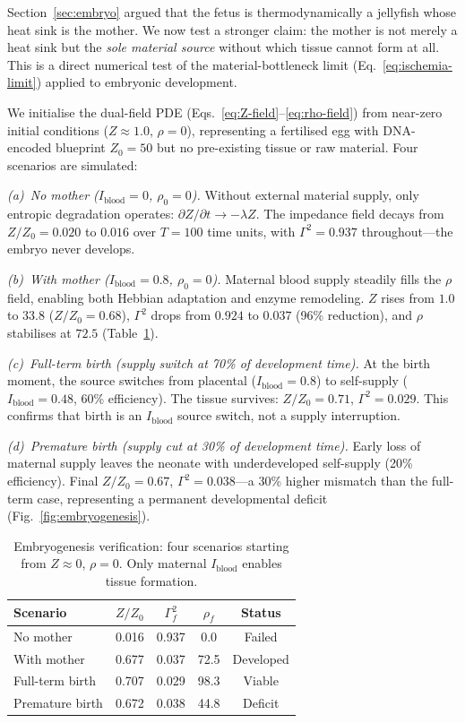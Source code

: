 ﻿\documentclass[aps,pre,twocolumn,superscriptaddress,floatfix]{revtex4-2}
\begin{document}
Section~\ref{sec:embryo} argued that the fetus is thermodynamically
a jellyfish whose heat sink is the mother.
We now test a stronger claim: the mother is not merely a heat sink
but the \emph{sole material source} without which tissue cannot form
at all.
This is a direct numerical test of the material-bottleneck limit
(Eq.~\eqref{eq:ischemia-limit}) applied to embryonic development.

We initialise the dual-field PDE
(Eqs.~\eqref{eq:Z-field}--\eqref{eq:rho-field})
from near-zero initial conditions ($Z \approx 1.0$, $\rho = 0$),
representing a fertilised egg with DNA-encoded blueprint $Z_0 = 50$
but no pre-existing tissue or raw material.
Four scenarios are simulated:

\emph{(a)~No mother ($I_{\mathrm{blood}} = 0$,
$\rho_0 = 0$).}
Without external material supply, only entropic degradation
operates: $\partial Z/\partial t \to -\lambda Z$.
The impedance field decays from $Z/Z_0 = 0.020$ to $0.016$
over $T = 100$ time units, with $\Gamma^2 = 0.937$
throughout---the embryo never develops.

\emph{(b)~With mother ($I_{\mathrm{blood}} = 0.8$,
$\rho_0 = 0$).}
Maternal blood supply steadily fills the $\rho$ field,
enabling both Hebbian adaptation and enzyme remodeling.
$Z$ rises from $1.0$ to $33.8$ ($Z/Z_0 = 0.68$),
$\Gamma^2$ drops from $0.924$ to $0.037$ (96\% reduction),
and $\rho$ stabilises at $72.5$
(Table~\ref{tab:embryogenesis}).

\emph{(c)~Full-term birth (supply switch at 70\%
of development time).}
At the birth moment, the source switches from placental
($I_{\mathrm{blood}} = 0.8$) to self-supply
($I_{\mathrm{blood}} = 0.48$, 60\% efficiency).
The tissue survives: $Z/Z_0 = 0.71$, $\Gamma^2 = 0.029$.
This confirms that birth is an $I_{\mathrm{blood}}$
source switch, not a supply interruption.

\emph{(d)~Premature birth (supply cut at 30\%
of development time).}
Early loss of maternal supply leaves the neonate with
underdeveloped self-supply (20\% efficiency).
Final $Z/Z_0 = 0.67$, $\Gamma^2 = 0.038$---a
30\% higher mismatch than the full-term case,
representing a permanent developmental deficit
(Fig.~\ref{fig:embryogenesis}).

\begin{table}[h]
  \centering
  \caption{Embryogenesis verification: four scenarios starting
  from $Z \approx 0$, $\rho = 0$.
  Only maternal $I_{\mathrm{blood}}$ enables tissue formation.}
  \label{tab:embryogenesis}
  \begin{tabular}{lcccc}
  \hline
  Scenario & $Z/Z_0$ & $\Gamma^2_f$ & $\rho_f$ & Status \\
  \hline
  No mother          & 0.016 & 0.937 &   0.0 & Failed  \\
  With mother        & 0.677 & 0.037 &  72.5 & Developed \\
  Full-term birth    & 0.707 & 0.029 &  98.3 & Viable  \\
  Premature birth    & 0.672 & 0.038 &  44.8 & Deficit \\
  \hline
  \end{tabular}
\end{table}
\end{document}
